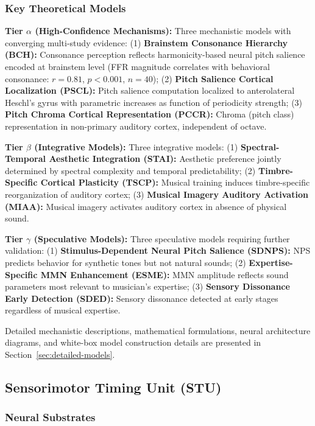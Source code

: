 \documentclass[9pt,onecolumn]{article}
\newcommand{\STU}{\textcolor{stucolor}{\textbf{STU}}}
\begin{document}
\subsubsection{Key Theoretical Models}

\textbf{Tier $\alpha$ (High-Confidence Mechanisms):} Three mechanistic models with converging multi-study evidence: (1) \textbf{Brainstem Consonance Hierarchy (BCH):} Consonance perception reflects harmonicity-based neural pitch salience encoded at brainstem level (FFR magnitude correlates with behavioral consonance: $r=0.81$, $p<0.001$, $n=40$); (2) \textbf{Pitch Salience Cortical Localization (PSCL):} Pitch salience computation localized to anterolateral Heschl's gyrus with parametric increases as function of periodicity strength; (3) \textbf{Pitch Chroma Cortical Representation (PCCR):} Chroma (pitch class) representation in non-primary auditory cortex, independent of octave.

\textbf{Tier $\beta$ (Integrative Models):} Three integrative models: (1) \textbf{Spectral-Temporal Aesthetic Integration (STAI):} Aesthetic preference jointly determined by spectral complexity and temporal predictability; (2) \textbf{Timbre-Specific Cortical Plasticity (TSCP):} Musical training induces timbre-specific reorganization of auditory cortex; (3) \textbf{Musical Imagery Auditory Activation (MIAA):} Musical imagery activates auditory cortex in absence of physical sound.

\textbf{Tier $\gamma$ (Speculative Models):} Three speculative models requiring further validation: (1) \textbf{Stimulus-Dependent Neural Pitch Salience (SDNPS):} NPS predicts behavior for synthetic tones but not natural sounds; (2) \textbf{Expertise-Specific MMN Enhancement (ESME):} MMN amplitude reflects sound parameters most relevant to musician's expertise; (3) \textbf{Sensory Dissonance Early Detection (SDED):} Sensory dissonance detected at early stages regardless of musical expertise.

Detailed mechanistic descriptions, mathematical formulations, neural architecture diagrams, and white-box model construction details are presented in Section~\ref{sec:detailed-models}.

\subsection{Sensorimotor Timing Unit (\STU{})}

\subsubsection{Neural Substrates}
\end{document}
